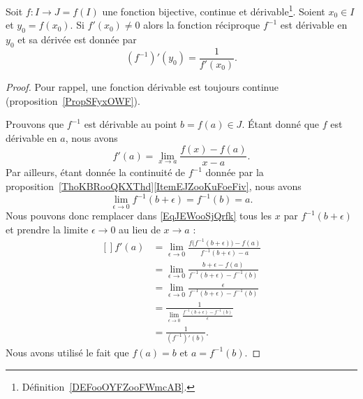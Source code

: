 \begin{proposition} \label{PropMRBooXnnDLq}
    Soit \( f\colon I\to J=f(I)\) une fonction bijective, continue et dérivable\footnote{Définition~\ref{DEFooOYFZooFWmcAB}.}. Soient \( x_0\in I\) et \( y_0=f(x_0)\). Si \( f'(x_0)\neq 0\) alors la fonction réciproque \( f^{-1}\) est dérivable en \( y_0\) et sa dérivée est donnée par
    \begin{equation}
        (f^{-1})'(y_0)=\frac{1}{ f'(x_0) }.
    \end{equation}
\end{proposition}

\begin{proof}
    Pour rappel, une fonction dérivable est toujours continue (proposition~\ref{PropSFyxOWF}).

    Prouvons que \( f^{-1}\) est dérivable au point \( b=f(a)\in J\). Étant donné que \( f\) est dérivable en \( a\), nous avons
    \begin{equation}\label{EqJEWooSjQrfk}
        f'(a)=\lim_{x\to a} \frac{ f(x)-f(a) }{ x-a }.
    \end{equation}
    Par ailleurs, étant donnée la continuité de \( f^{-1}\) donnée par la proposition~\ref{ThoKBRooQKXThd}\ref{ItemEJZooKuFoeFiv}, nous avons
    \begin{equation}
        \lim_{\epsilon\to 0} f^{-1}(b+\epsilon)=f^{-1}(b)=a.
    \end{equation}
    Nous pouvons donc remplacer dans \eqref{EqJEWooSjQrfk} tous les \( x\) par \( f^{-1}(b+\epsilon)\) et prendre la limite \( \epsilon\to 0\) au lieu de \( x\to a\) :
    \begin{equation}
        \begin{aligned}[]
            f'(a)&=\lim_{\epsilon\to 0}\frac{ f\big( f^{-1}(b+\epsilon) \big)-f(a) }{ f^{-1}(b+\epsilon)-a }\\
            &=\lim_{\epsilon\to 0}\frac{ b+\epsilon-f(a) }{ f^{-1}(b+\epsilon)-f^{-1}(b) }\\
            &=\lim_{\epsilon\to 0}\frac{ \epsilon }{ f^{-1}(b+\epsilon)-f^{-1}(b) }\\
            &=\frac{1}{ \lim_{\epsilon\to 0}\frac{ f^{-1}(b+\epsilon)-f^{-1}(b) }{ \epsilon } }\\
            &=\frac{1}{ (f^{-1})'(b) }.
        \end{aligned}
    \end{equation}
    Nous avons utilisé le fait que \( f(a)=b\) et \( a=f^{-1}(b)\).
\end{proof}


